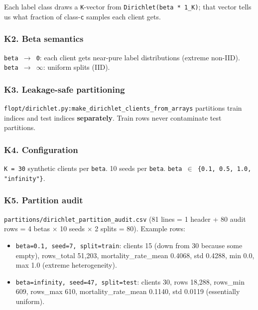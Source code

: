 \documentclass{article}
\begin{document}
Each label class draws a \texttt{K}-vector from \texttt{Dirichlet(beta * 1\_K)}; that vector tells us what fraction of class-\texttt{c} samples each client gets.


\subsubsection{K2. Beta semantics}


\texttt{beta \ensuremath{\rightarrow} 0}: each client gets near-pure label distributions (extreme non-IID). \texttt{beta \ensuremath{\rightarrow} \ensuremath{\infty}}: uniform splits (IID).


\subsubsection{K3. Leakage-safe partitioning}


\texttt{flopt/dirichlet.py:make\_dirichlet\_clients\_from\_arrays} partitions train indices and test indices \textbf{separately}. Train rows never contaminate test partitions.


\subsubsection{K4. Configuration}


\texttt{K = 30} synthetic clients per \texttt{beta}. 10 seeds per \texttt{beta}. \texttt{beta \ensuremath{\in} \{0.1, 0.5, 1.0, "infinity"\}}.


\subsubsection{K5. Partition audit}


\texttt{partitions/dirichlet\_partition\_audit.csv} (81 lines = 1 header + 80 audit rows = 4 betas \ensuremath{\times} 10 seeds \ensuremath{\times} 2 splits = 80). Example rows:

\begin{itemize}[leftmargin=1.4em,itemsep=2pt,topsep=2pt]
  \item \texttt{beta=0.1, seed=7, split=train}: clients 15 (down from 30 because some empty), rows\_total 51,203, mortality\_rate\_mean 0.4068, std 0.4288, min 0.0, max 1.0 (extreme heterogeneity).
  \item \texttt{beta=infinity, seed=47, split=test}: clients 30, rows 18,288, rows\_min 609, rows\_max 610, mortality\_rate\_mean 0.1140, std 0.0119 (essentially uniform).
\end{itemize}
\end{document}
